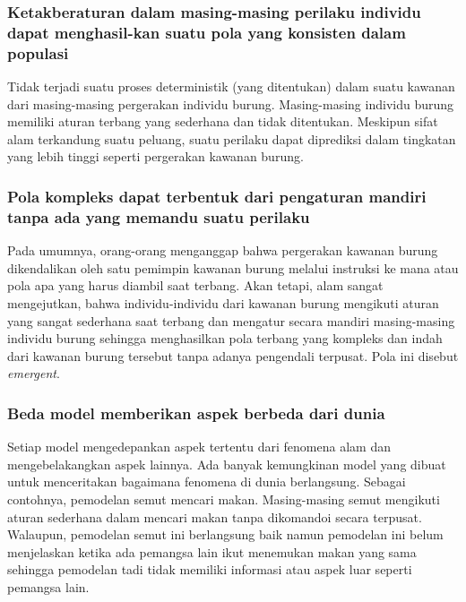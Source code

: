 \subsubsection*{Ketakberaturan dalam masing-masing perilaku individu dapat menghasil-kan suatu pola yang konsisten dalam populasi}

Tidak terjadi suatu proses deterministik (yang ditentukan) dalam suatu kawanan dari masing-masing pergerakan individu burung. Masing-masing individu burung memiliki aturan terbang yang sederhana dan tidak ditentukan. Meskipun sifat alam terkandung suatu peluang, suatu perilaku dapat diprediksi dalam tingkatan yang lebih tinggi seperti pergerakan kawanan burung.

\subsubsection*{Pola kompleks dapat terbentuk dari pengaturan mandiri tanpa ada yang memandu suatu perilaku}

Pada umumnya, orang-orang menganggap bahwa pergerakan kawanan burung dikendalikan oleh satu pemimpin kawanan burung melalui instruksi ke mana atau pola apa yang harus diambil saat terbang. Akan tetapi, alam sangat mengejutkan, bahwa individu-individu dari kawanan burung mengikuti aturan yang sangat sederhana saat terbang dan mengatur secara mandiri masing-masing individu burung sehingga menghasilkan pola terbang yang kompleks dan indah dari kawanan burung tersebut tanpa adanya pengendali terpusat. Pola ini disebut \textit{emergent}.

\subsubsection*{Beda model memberikan aspek berbeda dari dunia}

Setiap model mengedepankan aspek tertentu dari fenomena alam dan mengebelakangkan aspek lainnya. Ada banyak kemungkinan model yang dibuat untuk menceritakan bagaimana fenomena di dunia berlangsung. Sebagai contohnya, pemodelan semut mencari makan. Masing-masing semut mengikuti aturan sederhana dalam mencari makan tanpa dikomandoi secara terpusat. Walaupun, pemodelan semut ini berlangsung baik namun pemodelan ini belum menjelaskan ketika ada pemangsa lain ikut menemukan makan yang sama sehingga pemodelan tadi tidak memiliki informasi atau aspek luar seperti pemangsa lain.
